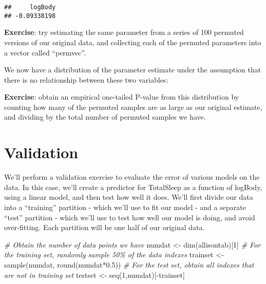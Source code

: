 \documentclass[
]{book}
\newenvironment{Shaded}{\begin{snugshade}}{\end{snugshade}}
\newcommand{\AttributeTok}[1]{\textcolor[rgb]{0.77,0.63,0.00}{#1}}
\newcommand{\CommentTok}[1]{\textcolor[rgb]{0.56,0.35,0.01}{\textit{#1}}}
\newcommand{\DecValTok}[1]{\textcolor[rgb]{0.00,0.00,0.81}{#1}}
\newcommand{\FloatTok}[1]{\textcolor[rgb]{0.00,0.00,0.81}{#1}}
\newcommand{\FunctionTok}[1]{\textcolor[rgb]{0.00,0.00,0.00}{#1}}
\newcommand{\NormalTok}[1]{#1}
\newcommand{\OtherTok}[1]{\textcolor[rgb]{0.56,0.35,0.01}{#1}}
\newcommand{\SpecialCharTok}[1]{\textcolor[rgb]{0.00,0.00,0.00}{#1}}
\begin{document}
\begin{Shaded}
\end{Shaded}

\begin{verbatim}
##     logBody 
## -0.09338198
\end{verbatim}

\textbf{Exercise}: try estimating the same parameter from a series of 100 permuted versions of our original data, and collecting each of the permuted parameters into a vector called ``permvec''.

We now have a distribution of the parameter estimate under the assumption that there is no relationship between these two variables:

\textbf{Exercise}: obtain an empirical one-tailed P-value from this distribution by counting how many of the permuted samples are as large as our original estimate, and dividing by the total number of permuted samples we have.

\hypertarget{validation}{%
\section{Validation}\label{validation}}

We'll perform a validation exercise to evaluate the error of various models on the data. In this case, we'll create a predictor for TotalSleep as a function of logBody, using a linear model, and then test how well it does. We'll first divide our data into a ``training'' partition - which we'll use to fit our model - and a separate ``test'' partition - which we'll use to test how well our model is doing, and avoid over-fitting. Each partition will be one half of our original data.

\begin{Shaded}
\begin{Highlighting}[]
\CommentTok{\# Obtain the number of data points we have}
\NormalTok{numdat }\OtherTok{\textless{}{-}} \FunctionTok{dim}\NormalTok{(allisontab)[}\DecValTok{1}\NormalTok{]}
\CommentTok{\# For the training set, randomly sample 50\% of the data indexes}
\NormalTok{trainset }\OtherTok{\textless{}{-}} \FunctionTok{sample}\NormalTok{(numdat, }\FunctionTok{round}\NormalTok{(numdat}\SpecialCharTok{*}\FloatTok{0.5}\NormalTok{))}
\CommentTok{\# For the test set, obtain all indexes that are not in training set}
\NormalTok{testset }\OtherTok{\textless{}{-}} \FunctionTok{seq}\NormalTok{(}\DecValTok{1}\NormalTok{,numdat)[}\SpecialCharTok{{-}}\NormalTok{trainset]}
\end{Highlighting}
\end{Shaded}
\end{document}
